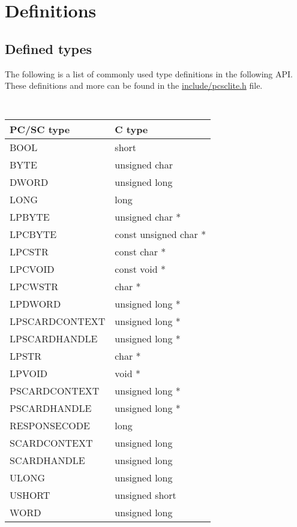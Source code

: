 \documentclass[a4paper,12pt]{article}
\begin{document}
\section{Definitions}


\subsection{Defined types}

The following is a list of commonly used type definitions in the
following API. These definitions and more can be found in the
\url{include/pcsclite.h} file.

{\tt
\begin{longtable}{|l|l|}
\hline
\textrm{PC/SC type} & \textrm{C type} \\
\hline
\hline
BOOL  &  short \\
BYTE  &  unsigned char \\
DWORD  &  unsigned long \\
LONG  &  long \\
LPBYTE  &  unsigned char * \\
LPCBYTE  &  const unsigned char * \\
LPCSTR  &  const char * \\
LPCVOID  &  const void * \\
LPCWSTR  &  char * \\
LPDWORD  &  unsigned long * \\
LPSCARDCONTEXT & unsigned long * \\
LPSCARDHANDLE & unsigned long * \\
LPSTR  &  char * \\
LPVOID  &  void * \\
PSCARDCONTEXT & unsigned long * \\
PSCARDHANDLE & unsigned long * \\
RESPONSECODE & long \\
SCARDCONTEXT & unsigned long \\
SCARDHANDLE & unsigned long \\
ULONG  &  unsigned long \\
USHORT  &  unsigned short \\
WORD  &  unsigned long \\
\hline
\end{longtable}
}

\end{document}
